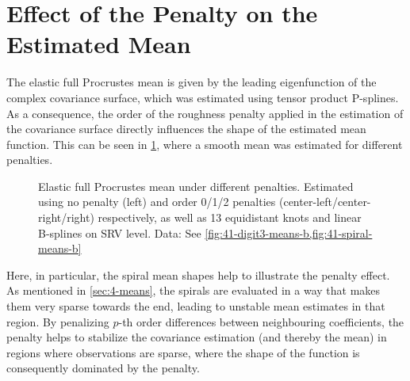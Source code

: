 \section{Effect of the Penalty on the Estimated Mean}
\label{sec:4-penalty}
The elastic full Procrustes mean is given by the leading eigenfunction of the complex covariance surface, which was estimated using tensor product P-splines.
As a consequence, the order of the roughness penalty applied in the estimation of the covariance surface directly influences the shape of the estimated mean function.
This can be seen in \cref{fig:4-penalty}, where a smooth mean was estimated for different penalties.
\begin{figure}
  \centering
  \begin{subfigure}{\textwidth}
  \end{subfigure}
  \begin{subfigure}{\textwidth}
  \end{subfigure}
  \caption{Elastic full Procrustes mean under different penalties.
  Estimated using no penalty (left) and order 0/1/2 penalties (center-left/center-right/right) respectively, as well as 13 equidistant knots and linear B-splines on SRV level.
  Data: See \cref{fig:41-digit3-means-b,fig:41-spiral-means-b}}
  \label{fig:4-penalty}
\end{figure}
Here, in particular, the spiral mean shapes help to illustrate the penalty effect.
As mentioned in \cref{sec:4-means}, the spirals are evaluated in a way that makes them very sparse towards the end, leading to unstable mean estimates in that region.
By penalizing $p$-th order differences between neighbouring coefficients, the penalty helps to stabilize the covariance estimation (and thereby the mean) in regions where observations are sparse, where the shape of the function is consequently dominated by the penalty.

